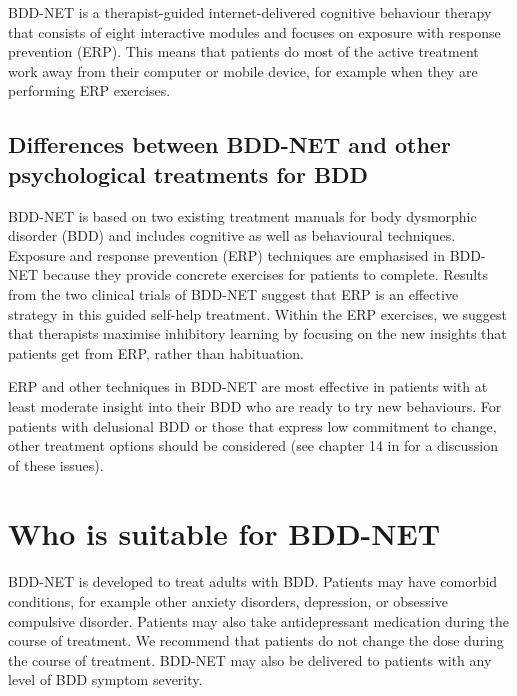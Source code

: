 \documentclass[]{book}
\theoremstyle{definition}
\theoremstyle{definition}
\theoremstyle{definition}
\theoremstyle{remark}
\begin{document}
BDD-NET is a therapist-guided internet-delivered cognitive behaviour
therapy that consists of eight interactive modules and focuses on
exposure with response prevention (ERP). This means that patients do
most of the active treatment work away from their computer or mobile
device, for example when they are performing ERP exercises.

\hypertarget{differences-between-bdd-net-and-other-psychological-treatments-for-bdd}{%
\subsection{Differences between BDD-NET and other psychological
treatments for
BDD}\label{differences-between-bdd-net-and-other-psychological-treatments-for-bdd}}

BDD-NET is based on two existing treatment manuals for body dysmorphic
disorder (BDD) \citep{veale2010, wilhelm2013} and includes cognitive as
well as behavioural techniques. Exposure and response prevention (ERP)
techniques are emphasised in BDD-NET because they provide concrete
exercises for patients to complete. Results from the two clinical trials
of BDD-NET \citep{enander2014, enander2016} suggest that ERP is an
effective strategy in this guided self-help treatment. Within the ERP
exercises, we suggest that therapists maximise inhibitory learning
\citep{craske2014} by focusing on the new insights that patients get
from ERP, rather than habituation.

ERP and other techniques in BDD-NET are most effective in patients with
at least moderate insight into their BDD who are ready to try new
behaviours. For patients with delusional BDD or those that express low
commitment to change, other treatment options should be considered (see
chapter 14 in \citet{veale2010} for a discussion of these issues).

\hypertarget{who-is-suitable-for-bdd-net}{%
\section{Who is suitable for
BDD-NET}\label{who-is-suitable-for-bdd-net}}

BDD-NET is developed to treat adults with BDD. Patients may have
comorbid conditions, for example other anxiety disorders, depression, or
obsessive compulsive disorder. Patients may also take antidepressant
medication during the course of treatment. We recommend that patients do
not change the dose during the course of treatment. BDD-NET may also be
delivered to patients with any level of BDD symptom severity.
\end{document}
